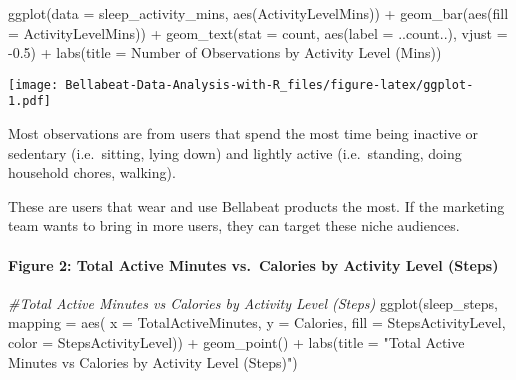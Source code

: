 \documentclass[
]{article}
\newenvironment{Shaded}{\begin{snugshade}}{\end{snugshade}}
\newcommand{\AttributeTok}[1]{\textcolor[rgb]{0.77,0.63,0.00}{#1}}
\newcommand{\CommentTok}[1]{\textcolor[rgb]{0.56,0.35,0.01}{\textit{#1}}}
\newcommand{\FloatTok}[1]{\textcolor[rgb]{0.00,0.00,0.81}{#1}}
\newcommand{\FunctionTok}[1]{\textcolor[rgb]{0.00,0.00,0.00}{#1}}
\newcommand{\NormalTok}[1]{#1}
\newcommand{\SpecialCharTok}[1]{\textcolor[rgb]{0.00,0.00,0.00}{#1}}
\newcommand{\StringTok}[1]{\textcolor[rgb]{0.31,0.60,0.02}{#1}}
\begin{document}
\begin{Shaded}
\begin{Highlighting}[]
\FunctionTok{ggplot}\NormalTok{(}\AttributeTok{data =}\NormalTok{ sleep\_activity\_mins, }\FunctionTok{aes}\NormalTok{(ActivityLevelMins)) }\SpecialCharTok{+} 
  \FunctionTok{geom\_bar}\NormalTok{(}\FunctionTok{aes}\NormalTok{(}\AttributeTok{fill =}\NormalTok{ ActivityLevelMins)) }\SpecialCharTok{+}
  \FunctionTok{geom\_text}\NormalTok{(}\AttributeTok{stat =} \StringTok{\textquotesingle{}count\textquotesingle{}}\NormalTok{, }\FunctionTok{aes}\NormalTok{(}\AttributeTok{label =}\NormalTok{ ..count..), }\AttributeTok{vjust =}  \SpecialCharTok{{-}}\FloatTok{0.5}\NormalTok{) }\SpecialCharTok{+}
  \FunctionTok{labs}\NormalTok{(}\AttributeTok{title =} \StringTok{\textquotesingle{}Number of Observations by Activity Level (Mins)\textquotesingle{}}\NormalTok{)}
\end{Highlighting}
\end{Shaded}

\texttt{[image: Bellabeat-Data-Analysis-with-R\_files/figure-latex/ggplot-1.pdf]}

Most observations are from users that spend the most time being inactive
or sedentary (i.e.~sitting, lying down) and lightly active
(i.e.~standing, doing household chores, walking).

These are users that wear and use Bellabeat products the most. If the
marketing team wants to bring in more users, they can target these niche
audiences.

\hypertarget{figure-2-total-active-minutes-vs.-calories-by-activity-level-steps}{%
\paragraph{Figure 2: Total Active Minutes vs.~Calories by Activity Level
(Steps)}\label{figure-2-total-active-minutes-vs.-calories-by-activity-level-steps}}

\begin{Shaded}
\begin{Highlighting}[]
\CommentTok{\#Total Active Minutes vs Calories by Activity Level (Steps)}
\FunctionTok{ggplot}\NormalTok{(sleep\_steps, }\AttributeTok{mapping =} \FunctionTok{aes}\NormalTok{(}
  \AttributeTok{x =}\NormalTok{ TotalActiveMinutes, }\AttributeTok{y =}\NormalTok{ Calories, }\AttributeTok{fill =}\NormalTok{ StepsActivityLevel, }\AttributeTok{color =}\NormalTok{ StepsActivityLevel)) }\SpecialCharTok{+} 
  \FunctionTok{geom\_point}\NormalTok{() }\SpecialCharTok{+}
  \FunctionTok{labs}\NormalTok{(}\AttributeTok{title =} \StringTok{"Total Active Minutes vs Calories by Activity Level (Steps)"}\NormalTok{)}
\end{Highlighting}
\end{Shaded}
\end{document}

